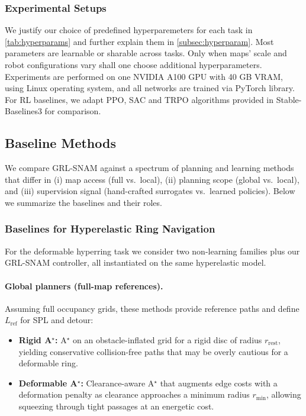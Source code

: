\subsubsection{Experimental Setups}

We justify our choice of predefined hyperparemeters for each task in \cref{tab:hyperparams} and further explain them in \ref{subsec:hyperparam}. Most parameters are learnable or sharable across tasks. Only when maps' scale and robot configurations vary shall one choose additional hyperparameters. Experiments are performed on one NVIDIA A100 GPU with 40 GB VRAM, using Linux operating system, and all networks are trained via PyTorch \citep{paszke2019pytorch} library. For RL baselines, we adapt PPO, SAC and TRPO algorithms provided in Stable-Baselines3 \citep{stable-baselines3} for comparison. 







\subsection{Baseline Methods}
\label{subsec:baselines}

We compare GRL-SNAM against a spectrum of planning and learning methods that differ in (i) map access (full vs.\ local), (ii) planning scope (global vs.\ local), and (iii) supervision signal (hand-crafted surrogates vs.\ learned policies). Below we summarize the baselines and their roles.

\subsubsection{Baselines for Hyperelastic Ring Navigation}
\label{subsubsec:baselines_ring}

For the deformable hyperring task we consider two non-learning families plus our GRL-SNAM controller, all instantiated on the same hyperelastic model.

\paragraph{Global planners (full-map references).}
Assuming full occupancy grids, these methods provide reference paths and define $L_{\mathrm{ref}}$ for SPL and detour:
\begin{itemize}
    \item \textbf{Rigid A$^{\star}$:} A$^{\star}$ on an obstacle-inflated grid for a rigid disc of radius $r_{\text{rest}}$, yielding conservative collision-free paths that may be overly cautious for a deformable ring.
    \item \textbf{Deformable A$^{\star}$:} Clearance-aware A$^{\star}$ that augments edge costs with a deformation penalty as clearance approaches a minimum radius $r_{\min}$, allowing squeezing through tight passages at an energetic cost.
\end{itemize}

